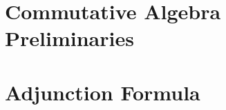 \maketitle


\section{Commutative Algebra Preliminaries}



\section{Adjunction Formula}


%
%
%
%
%
%
%
%
%
%
%
%
%
%
%
%
%
%
%

